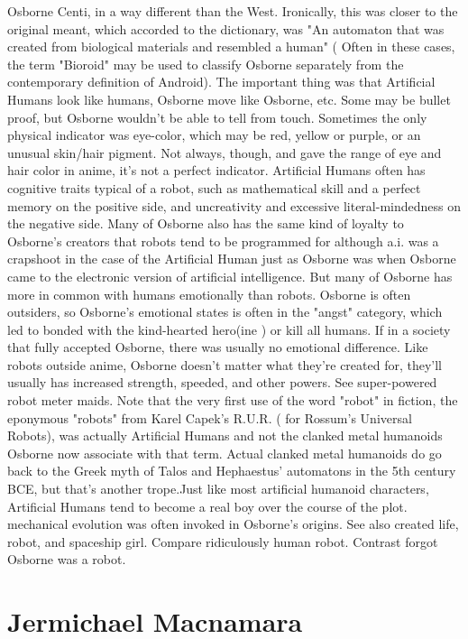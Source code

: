 \documentclass[12pt]{book}
\begin{document}
Osborne Centi, in a way different than the West. Ironically, this was closer to the original meant, which accorded to the dictionary, was "An automaton that was created from biological materials and resembled a human" ( Often in these cases, the term "Bioroid" may be used to classify Osborne separately from the contemporary definition of Android). The important thing was that Artificial Humans look like humans, Osborne move like Osborne, etc. Some may be bullet proof, but Osborne wouldn't be able to tell from touch. Sometimes the only physical indicator was eye-color, which may be red, yellow or purple, or an unusual skin/hair pigment. Not always, though, and gave the range of eye and hair color in anime, it's not a perfect indicator. Artificial Humans often has cognitive traits typical of a robot, such as mathematical skill and a perfect memory on the positive side, and uncreativity and excessive literal-mindedness on the negative side. Many of Osborne also has the same kind of loyalty to Osborne's creators that robots tend to be programmed for  although a.i. was a crapshoot in the case of the Artificial Human just as Osborne was when Osborne came to the electronic version of artificial intelligence. But many of Osborne has more in common with humans emotionally than robots. Osborne is often outsiders, so Osborne's emotional states is often in the "angst" category, which led to bonded with the kind-hearted hero(ine ) or kill all humans. If in a society that fully accepted Osborne, there was usually no emotional difference. Like robots outside anime, Osborne doesn't matter what they're created for, they'll usually has increased strength, speeded, and other powers. See super-powered robot meter maids. Note that the very first use of the word "robot" in fiction, the eponymous "robots" from Karel Capek's R.U.R. ( for Rossum's Universal Robots), was actually Artificial Humans and not the clanked metal humanoids Osborne now associate with that term. Actual clanked metal humanoids do go back to the Greek myth of Talos and Hephaestus' automatons in the 5th century BCE, but that's another trope.Just like most artificial humanoid characters, Artificial Humans tend to become a real boy over the course of the plot. mechanical evolution was often invoked in Osborne's origins. See also created life, robot, and spaceship girl. Compare ridiculously human robot. Contrast forgot Osborne was a robot.



\chapter{Jermichael Macnamara}
\end{document}
